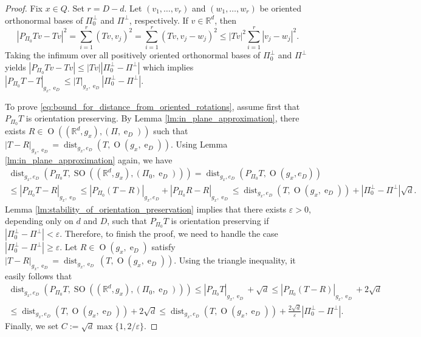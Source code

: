 \documentclass{article}
\numberwithin{equation}{section}
\theoremstyle{definition}
\theoremstyle{remark}
\DeclareMathOperator{\dist}{dist}
\DeclareMathOperator{\e}{e}
\DeclareMathOperator{\Ort}{O}
\DeclareMathOperator{\SO}{SO}
\begin{document}
\begin{proof}
    Fix $x \in Q$. Set $r = D - d$. Let $(v_1, \dots, v_r)$ and $(w_1, \dots, w_r)$ be oriented orthonormal bases of $\Pi_0^\perp$ and $\Pi^\perp$, respectively. If $v \in \mathbb{R}^d$, then
    \[
    |P_{\Pi_0}Tv - Tv|^2 = \sum_{i = 1}^r (Tv, v_j)^2 = \sum_{i = 1}^r (Tv, v_j - w_j)^2 \le |Tv|^2 \sum_{i = 1}^r |v_j - w_j|^2.
    \]
    Taking the infimum over all positively oriented orthonormal bases of $\Pi_0^\perp$ and $\Pi^\perp$ yields $|P_{\Pi_0}Tv - Tv| \le |Tv||\Pi_0^\perp - \Pi^\perp|$ which implies $|P_{\Pi_0}T - T|_{g_x, \e_D} \le |T|_{g_x, \e_D}|\Pi_0^\perp - \Pi^\perp|$.

    To prove \eqref{eq:bound_for_distance_from_oriented_rotations}, assume first that $P_{\Pi_0}T$ is orientation preserving. By Lemma \ref{lm:in_plane_approximation}, there exists $R \in \Ort((\mathbb{R}^d, g_x), (\Pi, \e_D))$ such that $|T - R|_{g_x, \e_D} = \dist_{g_x, e_D}(T, \Ort(g_x, \e_D))$. Using Lemma \ref{lm:in_plane_approximation} again, we have
    \begin{multline*}
        \dist_{g_x, e_D}(P_{\Pi_0} T, \SO((\mathbb{R}^d, g_x), (\Pi_0, \e_D))) = \dist_{g_x, e_D}(P_{\Pi_0} T, \Ort(g_x, e_D)) \\
        \le |P_{\Pi_0} T - R|_{g_x, \e_D} \le |P_{\Pi_0} (T - R)|_{g_x, e_D} + |P_{\Pi_0} R - R|_{g_x, \e_D} \le \dist_{g_x, e_D}(T, \Ort(g_x, \e_D)) + |\Pi_0^\perp - \Pi^\perp| \sqrt{d}.
    \end{multline*}
    Lemma \ref{lm:stability_of_orientation_preservation} implies that there exists $\varepsilon > 0$, depending only on $d$ and $D$, such that $P_{\Pi_0}T$ is orientation preserving if $|\Pi_0^\perp - \Pi^\perp| < \varepsilon$. Therefore, to finish the proof, we need to handle the case $|\Pi_0^\perp - \Pi^\perp| \ge \varepsilon$. Let $R \in \Ort(g_x, \e_D)$ satisfy $|T - R|_{g_x, \e_D} = \dist_{g_x, \e_D}(T, \Ort(g_x, \e_D))$. Using the triangle inequality, it easily follows that
    \begin{multline*}
        \dist_{g_x, e_D}(P_{\Pi_0} T, \SO((\mathbb{R}^d, g_x), (\Pi_0, \e_D))) \le |P_{\Pi_0}T|_{g_x, \e_D} + \sqrt{d} \le |P_{\Pi_0}(T - R)|_{g_x, \e_D} + 2\sqrt{d} \\
        \le \dist_{g_x, e_D}(T, \Ort(g_x, \e_D)) + 2\sqrt{d} \le \dist_{g_x, e_D}(T, \Ort(g_x, \e_D)) + \frac{2\sqrt{d}}{\varepsilon} |\Pi_0^\perp - \Pi^\perp|.
    \end{multline*}
    Finally, we set $C := \sqrt{d}\max\{1, 2/\varepsilon\}$.
\end{proof}
\end{document}
